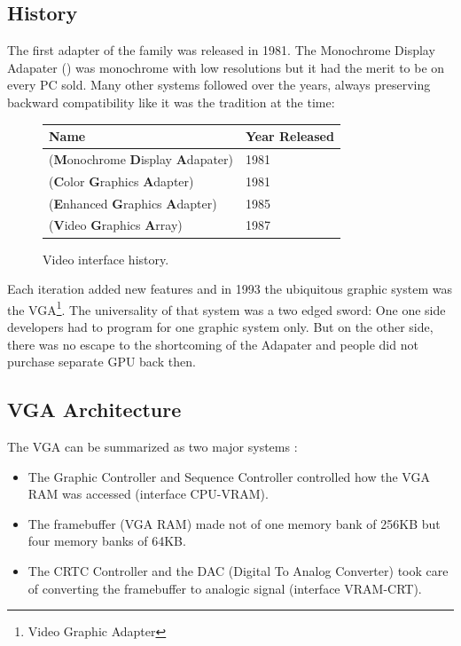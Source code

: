\documentclass[book.tex]{subfiles}
\begin{document}
  \subsection{History}

The first adapter of the family was released in 1981. The Monochrome Display
   Adapater () was monochrome with low resolutions but it had the merit to be on every PC sold. Many other systems followed over the years, always preserving backward compatibility like it was the tradition at the time:
\bigskip
  
 \begin{figure}[H]
\centering  
\begin{tabularx}{0.9\textwidth}{ X  Y }
  \toprule
  \textbf{Name} &  \textbf{Year Released} \\
  \toprule {}
   (\textbf{M}onochrome
   \textbf{D}isplay
   \textbf{A}dapater) & 1981 
   \\ 
   (\textbf{C}olor
   \textbf{G}raphics
   \textbf{A}dapter) & 1981 
    \\ 
   (\textbf{E}nhanced
   \textbf{G}raphics
   \textbf{A}dapter) & 1985
   \\ 
   (\textbf{V}ideo
   \textbf{G}raphics
   \textbf{A}rray)  & 1987
    \\
  \toprule
\end{tabularx}
\caption{Video interface history.}\label{fig:vga_history}
\end{figure}

Each iteration added new features and in 1993 the ubiquitous graphic system was the VGA\footnote{Video Graphic Adapter}. The universality of that system was a two edged sword: One one side developers had to program for one graphic system only. But on the other side, there was no escape to the shortcoming of the Adapater and people did not purchase separate GPU back then.\\

\subsection{VGA Architecture}

The VGA can be summarized as two major systems :

\begin{itemize}
\item The Graphic Controller and Sequence Controller controlled how the VGA RAM was accessed (interface CPU-VRAM).
\item The framebuffer (VGA RAM) made not of one memory bank of 256KB but four memory banks of 64KB.
\item The CRTC Controller and the DAC (Digital To Analog Converter) took care of converting the framebuffer to analogic signal (interface VRAM-CRT).
\end{itemize}
\end{document}
